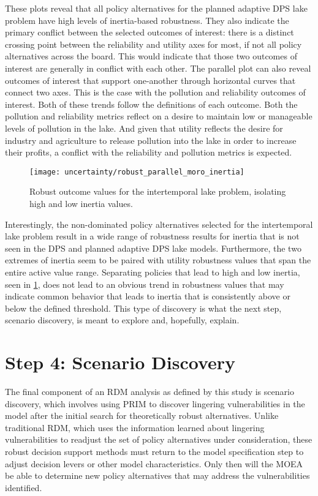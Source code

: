 These plots reveal that all policy alternatives for the planned adaptive DPS lake problem have high levels of inertia-based robustness. They also indicate the primary conflict between the selected outcomes of interest: there is a distinct crossing point between the reliability and utility axes for most, if not all policy alternatives across the board. This would indicate that those two outcomes of interest are generally in conflict with each other. The parallel plot can also reveal outcomes of interest that support one-another through horizontal curves that connect two axes. This is the case with the pollution and reliability outcomes of interest. Both of these trends follow the definitions of each outcome. Both the pollution and reliability metrics reflect on a desire to maintain low or manageable levels of pollution in the lake. And given that utility reflects the desire for industry and agriculture to release pollution into the lake in order to increase their profits, a conflict with the reliability and pollution metrics is expected. 

\begin{figure}[ht]
    \texttt{[image: uncertainty/robust\_parallel\_moro\_inertia]}
    \caption{Robust outcome values for the intertemporal lake problem, isolating high and low inertia values.}
    \label{fig:robust-parallel-moro-inertia}
\end{figure}

Interestingly, the non-dominated policy alternatives selected for the intertemporal lake problem result in a wide range of robustness results for inertia that is not seen in the DPS and planned adaptive DPS lake models. Furthermore, the two extremes of inertia seem to be paired with utility robustness values that span the entire active value range. Separating policies that lead to high and low inertia, seen in \cref{fig:robust-parallel-moro-inertia}, does not lead to an obvious trend in robustness values that may indicate common behavior that leads to inertia that is consistently above or below the defined threshold. This type of discovery is what the next step, scenario discovery, is meant to explore and, hopefully, explain.


\section{Step 4: Scenario Discovery} \label{results-step4}
The final component of an RDM analysis as defined by this study is scenario discovery, which involves using PRIM to discover lingering vulnerabilities in the model after the initial search for theoretically robust alternatives. Unlike traditional RDM, which uses the information learned about lingering vulnerabilities to readjust the set of policy alternatives under consideration, these robust decision support methods must return to the model specification step to adjust decision levers or other model characteristics. Only then will the MOEA be able to determine new policy alternatives that may address the vulnerabilities identified. 


